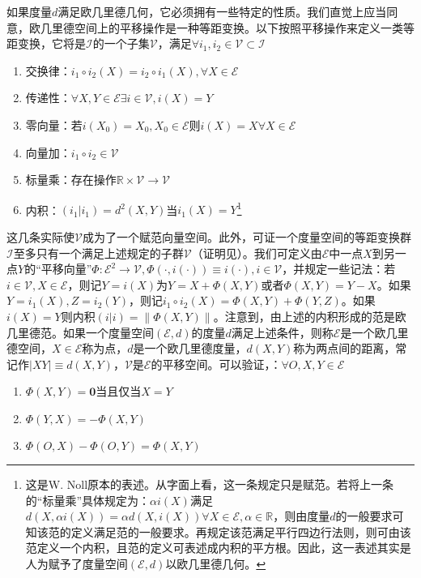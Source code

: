 \documentclass[main.tex]{subfiles}
\begin{document}
如果度量$d$满足欧几里德几何，它必须拥有一些特定的性质。我们直觉上应当同意，欧几里德空间上的平移操作是一种等距变换。以下按照平移操作来定义一类等距变换，它将是$\mathcal{I}$的一个子集$\mathcal{V}$，满足$\forall i_1, i_2\in\mathcal{V}\subset\mathcal{I}$
\begin{enumerate}
    \item 交换律：$i_1\circ i_2\left(X\right)=i_2\circ i_1\left(X\right),\forall X\in\mathcal{E}$
    \item 传递性：$\forall X,Y\in\mathcal{E}\exists i\in\mathcal{V}, i\left(X\right)=Y$
    \item 零向量：若$i\left(X_0\right)=X_0,X_0\in\mathcal{E}$则$i\left(X\right)=X\forall X\in\mathcal{E}$
    \item 向量加：$i_1\circ i_2\in\mathcal{V}$
    \item 标量乘：存在操作$\mathbb{R}\times \mathcal{V}\rightarrow\mathcal{V}$
    \item 内积：$\left(i_1|i_1\right)=d^2\left(X,Y\right)$当$i_1\left(X\right)=Y$\footnote{这是W. Noll原本的表述\cite{Noll1974}。从字面上看，这一条规定只是赋范。若将上一条的“标量乘”具体规定为：$\alpha i\left(X\right)$满足$d\left(X,\alpha i\left(X\right)\right)=\alpha d\left(X,i\left(X\right)\right)\forall X\in\mathcal{E},\alpha\in\mathbb{R}$，则由度量$d$的一般要求可知该范的定义满足范的一般要求。再规定该范满足平行四边行法则，则可由该范定义一个内积，且范的定义可表述成内积的平方根。因此，这一表述其实是人为赋予了度量空间$\left(\mathcal{E},d\right)$以欧几里德几何。}
\end{enumerate}
这几条实际使$\mathcal{V}$成为了一个赋范向量空间。此外，可证一个度量空间的等距变换群$\mathcal{I}$至多只有一个满足上述规定的子群$\mathcal{V}$（证明见\cite{Noll2011}）。我们可定义由$\mathcal{E}$中一点$X$到另一点$Y$的“平移向量”$\Phi:\mathcal{E}^2\rightarrow\mathcal{V},\Phi\left(\cdot,i\left(\cdot\right)\right)\equiv i\left(\cdot\right),i\in\mathcal{V}$，并规定一些记法：若$i\in\mathcal{V}, X\in\mathcal{E}$，则记$Y=i\left(X\right)$为$Y=X+\Phi\left(X,Y\right)$或者$\Phi\left(X,Y\right)=Y-X$。如果$Y=i_1\left(X\right),Z=i_2\left(Y\right)$，则记$i_1\circ i_2\left(X\right)=\Phi\left(X,Y\right)+\Phi\left(Y,Z\right)$。如果$i\left(X\right)=Y$则内积$\left(i|i\right)=\left\|\Phi\left(X,Y\right)\right\|$。注意到，由上述的内积形成的范是欧几里德范。如果一个度量空间$\left(\mathcal{E},d\right)$的度量$d$满足上述条件，则称$\mathcal{E}$是一个欧几里德空间，$X\in\mathcal{E}$称为点，$d$是一个欧几里德度量，$d\left(X,Y\right)$称为两点间的距离，常记作$\left|XY\right|\equiv d\left(X,Y\right)$，$\mathcal{V}$是$\mathcal{E}$的平移空间。可以验证，：$\forall O,X,Y\in\mathcal{E}$
\begin{enumerate}
    \item $\Phi\left(X,Y\right)=\mathbf{0}$当且仅当$X=Y$
    \item $\Phi\left(Y,X\right)=-\Phi\left(X,Y\right)$
    \item $\Phi\left(O,X\right)-\Phi\left(O,Y\right)=\Phi\left(X,Y\right)$
\end{enumerate}
\end{document}
